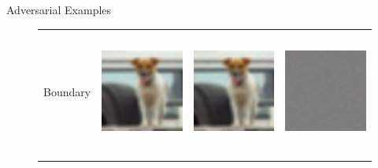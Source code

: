 \documentclass[final]{beamer}
\newlength{\onecolwid}
\newlength{\twocolwid}
\begin{document}
\begin{frame}[t]
\begin{columns}[t]
\begin{column}{\twocolwid}
\begin{columns}[t,totalwidth=\twocolwid]
\begin{column}{\onecolwid}
\begin{block}{Adversarial Examples}
\begin{figure}[h]
\begin{tabular}{rlll}
								Boundary & \includegraphics[height=4cm, align=c]{../figures/boundary_orig.pdf} & \includegraphics[height=4cm, align=c]{../figures/boundary_adversarial.pdf} & \includegraphics[height=4cm, align=c]{../figures/boundary_diff.pdf}\\
								\\

\end{tabular}
\end{figure}
\end{block}
\end{column}
\end{columns}
\end{column}
\end{columns}
\end{frame}
\end{document}

